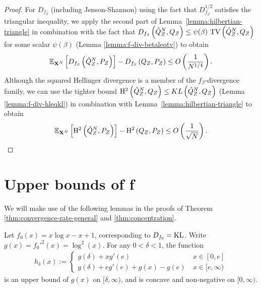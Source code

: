 \begin{proof}
For $D_{f_\beta}$ (including Jenson-Shannon) using the fact that $D_{f_\beta}^{1/2}$ satisfies the triangular inequality, we apply the second part of Lemma~\ref{lemma:hilbertian-triangle}
in combination with the fact that
$D_{f_\beta}\left(\hat{Q}^N_Z , Q_Z\right) \leq \psi(\beta) \ \mathrm{TV}\left( \hat{Q}^N_Z , Q_Z \right)$ for some scalar $\psi(\beta)$ (Lemma \ref{lemma:f-div-betaleqtv}) to obtain
%
\begin{align*}
    \mathbb{E}_{\mathbf{X}^N}\left[D_{f_\beta}\left( \hat{Q}^N_Z , P_Z\right)\right] - D_{f_\beta}\left( Q_{Z} , P_Z\right) \leq O\left(\frac{1}{N^{1/4}}\right).
\end{align*}
%
Although the squared Hellinger divergence is a member of the $f_\beta$-divergence family, we can use the tighter bound $\mathrm{H}^2\left( \hat{Q}^N_Z , Q_Z\right) \leq KL\left( \hat{Q}^N_Z , Q_Z\right)$ (Lemma \ref{lemma:f-div-hleqkl}) in combination with Lemma~\ref{lemma:hilbertian-triangle} to obtain
\begin{align*}
    \mathbb{E}_{\mathbf{X}^N}\left[\mathrm{H}^2\left( \hat{Q}^N_Z , P_Z\right)\right] - \mathrm{H}^2\left( Q_{Z} , P_Z\right) \leq O\left(\frac{1}{\sqrt{N}}\right).
\end{align*}
\end{proof}





\section{Upper bounds of f}\label{appendix:subsubsec:f-upper-bounds}

We will make use of the following lemmas in the proofs of Theorem \ref{thm:convergence-rate-general} and \ref{thm:concentration}.

\medskip

\begin{lemma}\label{lemma:concave-upper-bound-kl} 
Let $f_0(x)=x\log x - x +1$, corresponding to $D_{f_0} = \mathrm{KL}$.
Write $g(x) = f_0'^2(x) = \log^2(x)$.
For any $0< \delta < 1$, the function
\begin{align*}
    h_{\delta}(x) := \begin{cases} 
    g(\delta) + x g'(e) & \: x \in [0, e]\\
    g(\delta) + e g'(e) + g(x) - g(e) & \: x \in [e, \infty)
    \end{cases}
\end{align*}
is an upper bound of $g(x)$ on $[\delta, \infty)$, and is concave and non-negative on $[0, \infty)$.
\end{lemma}

